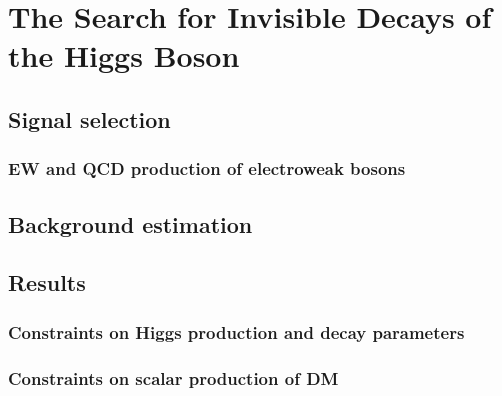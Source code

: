 \chapter{The Search for Invisible Decays of the Higgs Boson}

\section{Signal selection}

\subsection{EW and QCD production of electroweak bosons}

\section{Background estimation}

\section{Results}

\subsection{Constraints on Higgs production and decay parameters}

\subsection{Constraints on scalar production of DM}

